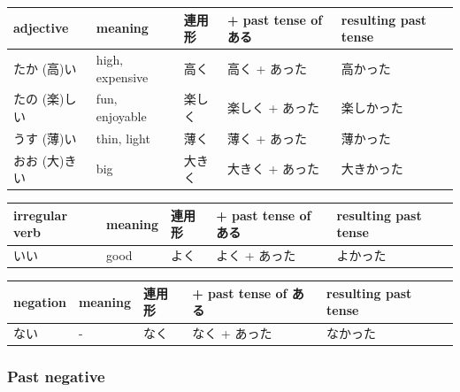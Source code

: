 \documentclass[11pt, b5paper, twoside, openright, onecolumn]{book}
\makeatletter
\newcommand*{\rtrubystack}[2]{{\relscale{0.5}%
  \begin{tabular}[b]{@{}c@{}}%
    {#1}\\%
    {\textscale{2}{#2}}%
  \end{tabular}}%
}
\DeclareRobustCommand*{\rtruby}[2]{%
  \mbox{%
    \setlength{\parskip}{0ex}%
    \BeginAccSupp{method=pdfstringdef,ActualText={#1}}%
      \rtrubystack{\phantom{#2}}{#1}%
      \llap{%
        \rtrubystack{#2}{\phantom{#1}}%
      }%
    \EndAccSupp{}%
  }%
}
\renewcommand*{\rtruby}[2]{#2 (#1)}%
\newenvironment{mytabularcentered}[1]{\noindent
\begin{center}\begin{tabular}[h]{#1}}{\end{tabular}\end{center}}
\makeatother
\begin{document}
\vspace{0.5cm}
\smaller
\begin{center}
\begin{mytabularcentered}{| l  l  l  l  l |}\hline 
\rule{0pt}{2.4ex}adjective & meaning & 連用形 & + past tense of ある & resulting past tense\\ 
\hline
\rule{0pt}{3.6ex}\rtruby{高}{たか}い & high‚ expensive & 高く & 高く + あった & 高かった\\ 
\rule{0pt}{3.6ex}\rtruby{楽}{たの}しい & fun‚ enjoyable & 楽しく & 楽しく + あった & 楽しかった\\ 
\rule{0pt}{3.6ex}\rtruby{薄}{うす}い & thin‚ light & 薄く & 薄く + あった & 薄かった\\ 
\rule{0pt}{3.6ex}\rtruby{大}{おお}きい & big & 大きく & 大きく + あった & 大きかった\\ 
\hline 
\end{mytabularcentered}
\end{center}
\larger
\vspace{0.5cm}

\smaller
\begin{center}
\begin{mytabularcentered}{| l  l  l  l  l |}\hline 
\rule{0pt}{2.4ex}irregular verb & meaning & 連用形 & + past tense of ある & resulting past tense\\ 
\hline
\rule{0pt}{2.4ex}いい & good & よく & よく + あった & \index[japanese]{よかった}よかった\\ 
\hline 
\end{mytabularcentered}
\end{center}
\larger
\vspace{0.5cm}

\smaller
\begin{center}
\begin{mytabularcentered}{| l  l  l  l  l |}\hline 
\rule{0pt}{2.4ex}negation & meaning & 連用形 & + past tense of ある & resulting past tense\\ 
\hline
\rule{0pt}{2.4ex}ない & - & なく & なく + あった & \index[japanese]{なかった}なかった\\ 
\hline 
\end{mytabularcentered}
\end{center}
\larger
\subsubsection{Past negative}
\end{document}
